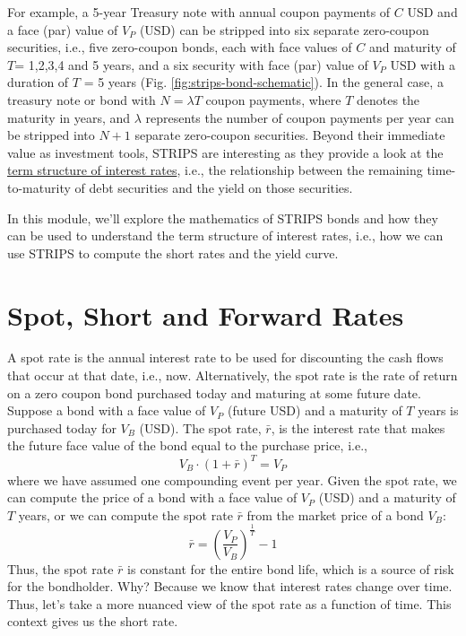 \documentclass[11pt]{article}
\theoremstyle{definition}
\begin{document}
For example, a 5-year Treasury note with annual coupon payments of $C$ USD and a face (par) value of $V_{P}$ (USD)
can be stripped into six separate zero-coupon securities, i.e., five zero-coupon bonds, each with face values of $C$ 
and maturity of $T$= 1,2,3,4 and 5 years, and a six security with face  (par) value of $V_{P}$ USD with a duration of $T$ = 5 years (Fig. \ref{fig:strips-bond-schematic}). 
In the general case, a treasury note or bond with $N=\lambda{T}$ coupon payments, where $T$ denotes the maturity in years, and $\lambda$ represents 
the number of coupon payments per year can be stripped into $N+1$ separate zero-coupon securities.
Beyond their immediate value as investment tools, STRIPS are interesting as they provide a look at the 
\href{https://www.federalreserve.gov/data/yield-curve-models.htm}{term structure of interest rates}, i.e., the relationship between the remaining time-to-maturity of debt securities 
and the yield on those securities.

In this module, we'll explore the mathematics of STRIPS bonds and how they can be used to understand the term structure of interest rates, i.e., how we can use STRIPS to compute the short rates and the yield curve.

\section*{Spot, Short and Forward Rates}
A spot rate is the annual interest rate to be used for discounting the cash flows that occur at that date, i.e., now. Alternatively, the spot rate is the rate of return on a zero coupon bond purchased today and maturing at some future date. Suppose a bond with a face value of $V_{P}$ (future USD) and a maturity of $T$ years is purchased today for $V_{B}$ (USD). The spot rate, $\bar{r}$, is the interest rate that makes the future face value of the bond equal to the purchase price, i.e.,
\begin{equation}
V_{B}\cdot(1+\bar{r})^{T} = V_{P}
\end{equation}
where we have assumed one compounding event per year. Given the spot rate, we can compute the price of a bond with a face value of $V_{P}$ (USD) and a maturity of $T$ years, or we can compute the spot rate $\bar{r}$ from the market price of a bond $V_{B}$:
\begin{equation}
\bar{r} = \left(\frac{V_{P}}{V_{B}}\right)^{\frac{1}{T}}-1
\end{equation}
Thus, the spot rate $\bar{r}$ is constant for the entire bond life, which is a source of risk for the bondholder.
Why? Because we know that interest rates change over time. Thus, let's take a more nuanced view of the spot rate as a function of time. This context gives us the short rate.
\end{document}
